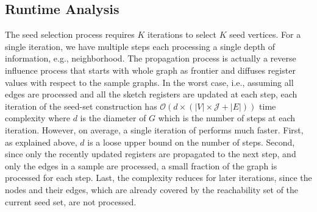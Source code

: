 
\subsection{Runtime Analysis}\label{sec:runtime}

The seed selection process requires $K$ iterations to select $K$ seed vertices. For a single iteration, we have multiple steps each processing a single depth of information, e.g., neighborhood. The propagation process is actually a reverse influence process that starts with whole graph as frontier and diffuses register values with respect to the sample graphs. In the worst case, i.e., assuming all edges are processed and all the sketch registers are updated at each step, each iteration of the seed-set construction has ${\mathcal O}(d \times (|V|\times \mathcal{J} + |E|))$ time complexity where $d$ is the diameter of $G$ which is the number of steps at each iteration. However, on average, a single iteration of \acro performs much faster. First, as explained above, $d$ is a loose upper bound on the number of steps. Second, since only the recently updated registers are propagated to the next step, and only the edges in a sample are processed, a small fraction of the graph is processed for each step. Last, the complexity reduces for later iterations, since the nodes and their edges, which are already covered by the reachability set of the current seed set, are not processed. 

